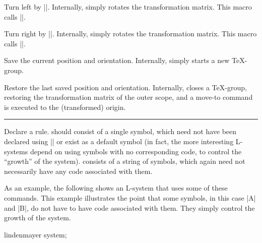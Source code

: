 \begin{command}{\pgfdeclarelindenmayersystem{}}
\begin{command}{\symbol{}}
        \begin{command}{\pgflsystemturnleft}
            Turn left by |\pgflsystemcurrentleftangle|. Internally, \pgfname{}
            simply rotates the transformation matrix. This macro calls
            |\pgflsystemrandomizeleftangle|.
        \end{command}

        \begin{command}{\pgflsystemturnright}
            Turn right by |\pgflsystemcurrentrightangle|. Internally,
            \pgfname{} simply rotates the transformation matrix. This macro
            calls |\pgflsystemrandomizerightangle|.
        \end{command}

        \begin{command}{\pgflsystemsavestate}
            Save the current position and orientation. Internally, \pgfname{}
            simply starts a new \TeX-group.
        \end{command}

        \begin{command}{\pgflsystemrestorestate}
            Restore the last saved position and orientation. Internally,
            \pgfname{} closes a \TeX-group, restoring the transformation matrix
            of the outer scope, and a move-to command is executed to the
            (transformed) origin.
        \end{command}
    \end{command}

    \begin{command}{\rule{\ttfamily\char`\{}}
        Declare a rule.  should consist of a single symbol, which
        need not have been declared using |\symbol| or exist as a default
        symbol (in fact, the more interesting L-systems depend on using symbols
        with no corresponding code, to control the ``growth'' of the system).
         consists of a string of symbols, which again need not
        necessarily have any code associated with them.
    \end{command}

    As an example, the following shows an L-system that uses some of these
    commands. This example illustrates the point that some symbols, in this
    case |A| and |B|, do not have to have code associated with them. They
    simply control the growth of the system.
\begin{codeexample}[pre={\nullfont\expandafter\let\csname pgf@lsystem@Hilbert curve\endcsname=\relax}]
\tikz\draw[lindenmayer system={Hilbert curve, axiom=A, order=4, angle=90}]
  lindenmayer system;
\end{codeexample}
\end{command}


